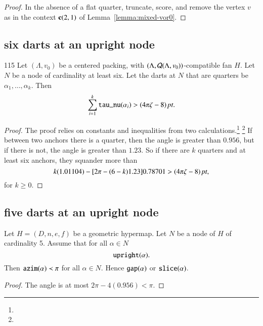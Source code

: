 \begin{proof}
In the absence of a flat quarter, truncate, score, and remove the
vertex $v$ as in the context ${\operatorname{\bf c}}{(2,1)}$ of
Lemma~\ref{lemma:mixed-vor0}. 
\end{proof}

\subsection{six darts at an upright node}
\begin{lemma}\label{lemma:context6-erase}{115}  
Let $(\Lambda,v_0)$ be a centered packing, 
with $(\Lambda,{\mathcal Q}(\Lambda,v_0))$-compatible fan $H$.
Let $N$ be a node of cardinality at least six.
Let the darts at $N$ that are quarters be
$\alpha_1,\ldots,\alpha_k$.
Then 
  $$
  \sum_{i=1}^k{\operatorname{{\texttt{tau\_nu}}}}(\alpha_i) > (4\pi\zeta-8)\,\hbox{\it pt}.
  $$
\end{lemma}

\begin{proof}
The proof relies on constants and inequalities from two
calculations.\footnote{} %
\footnote{} %
If between two anchors there is a quarter, then the angle is
greater than $0.956$, but if there is not,  the angle is greater than
$1.23$.  So if there are $k$ quarters and at least six anchors, they
squander more than
    $$ k (1.01104) - [2\pi-(6-k)1.23]0.78701 > (4\pi\zeta-8)\,\hbox{\it pt},$$
for $k\ge0$.
\end{proof}

\subsection{five darts at an upright node}
\label{sec:5updart}

\begin{lemma}\label{a:5dart:concave}  
Let $H=(D,n,e,f)$ be a geometric
hypermap.  Let $N$ 
be a node of $H$ of cardinality 5.    Assume that for all $\alpha\in N$
  $$
  {\operatorname{{\texttt{upright}}}}(\alpha).
  $$
Then ${\operatorname{{\texttt{azim}}}}(\alpha)\prec \pi$ for all $\alpha\in N$.
Hence ${\operatorname{{\texttt{gap}}}}(\alpha)$ or ${\operatorname{{\texttt{slice}}}}(\alpha)$.
\end{lemma}

\begin{proof}  The angle is at most $2\pi - 4(0.956) < \pi$.
\end{proof}

